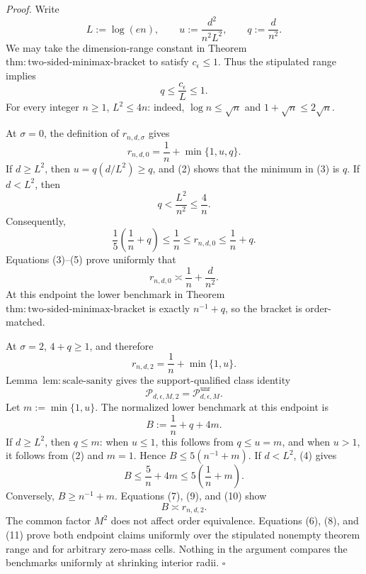 \textit{Proof.}
Write
\[
 L:=\log(en),\qquad
 u:=\frac{d^2}{n^2L^2},\qquad
 q:=\frac d{n^2}.
\tag{1}
\]
We may take the dimension-range constant in Theorem~\(\mathrm{thm:two\text{-}sided\text{-}minimax\text{-}bracket}\) to satisfy \(c_{\epsilon}\le1\).  Thus the stipulated range implies
\[
 q\le\frac{c_{\epsilon}}L\le1.
\tag{2}
\]
For every integer \(n\ge1\), \(L^2\le4n\): indeed, \(\log n\le\sqrt n\) and \(1+\sqrt n\le2\sqrt n\).

At \(\sigma=0\), the definition of \(r_{n,d,\sigma}\) gives
\[
 r_{n,d,0}=\frac1n+\min\{1,u,q\}.
\tag{3}
\]
If \(d\ge L^2\), then \(u=q(d/L^2)\ge q\), and (2) shows that the minimum in (3) is \(q\).  If \(d<L^2\), then
\[
 q<\frac{L^2}{n^2}\le\frac4n.
\tag{4}
\]
Consequently,
\[
 \frac15\left(\frac1n+q\right)
 \le\frac1n
 \le r_{n,d,0}
 \le\frac1n+q.
\tag{5}
\]
Equations (3)--(5) prove uniformly that
\[
 r_{n,d,0}\asymp\frac1n+\frac d{n^2}.
\tag{6}
\]
At this endpoint the lower benchmark in Theorem~\(\mathrm{thm:two\text{-}sided\text{-}minimax\text{-}bracket}\) is exactly \(n^{-1}+q\), so the bracket is order-matched.

At \(\sigma=2\), \(4+q\ge1\), and therefore
\[
 r_{n,d,2}=\frac1n+\min\{1,u\}.
\tag{7}
\]
Lemma~\(\mathrm{lem:scale\text{-}sanity}\) gives the support-qualified class identity
\[
 \mathcal P_{d,\epsilon,M,2}=\mathcal P_{d,\epsilon,M}^{\mathrm{unr}}.
\tag{8}
\]
Let \(m:=\min\{1,u\}\).  The normalized lower benchmark at this endpoint is
\[
 B:=\frac1n+q+4m.
\tag{9}
\]
If \(d\ge L^2\), then \(q\le m\): when \(u\le1\), this follows from \(q\le u=m\), and when \(u>1\), it follows from (2) and \(m=1\).  Hence \(B\le5(n^{-1}+m)\).  If \(d<L^2\), (4) gives
\[
 B\le\frac5n+4m\le5\left(\frac1n+m\right).
\tag{10}
\]
Conversely, \(B\ge n^{-1}+m\).  Equations (7), (9), and (10) show
\[
 B\asymp r_{n,d,2}.
\tag{11}
\]
The common factor \(M^2\) does not affect order equivalence.  Equations (6), (8), and (11) prove both endpoint claims uniformly over the stipulated nonempty theorem range and for arbitrary zero-mass cells.  Nothing in the argument compares the benchmarks uniformly at shrinking interior radii. \(\square\)